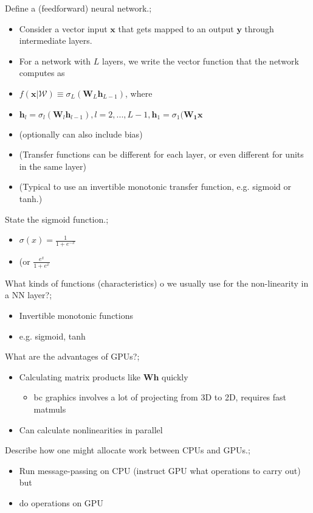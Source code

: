 \documentclass{article}
\begin{document}
Define a (feedforward) neural network.; \begin{itemize} \item Consider a vector input $\bm{x}$ that gets mapped to an output $\bm{y}$ through intermediate layers. \item For a network with $L$ layers, we write the vector function that the network computes as  \item $f(\bm{x}|\mathcal{W})\equiv \sigma_L(\bm{W}_L\bm{h}_{L-1})$, where \item $\bm{h}_l = \sigma_l(\bm{W}_l\bm{h}_{l-1}), l=2,...,L-1, \bm{h}_1 = \sigma_1(\bm{W_1x}$ \item (optionally can also include bias) \item (Transfer functions can be different for each layer, or even different for units in the same layer) \item (Typical to use an invertible monotonic transfer function, e.g. sigmoid or tanh.) \end{itemize}

State the sigmoid function.; \begin{itemize} \item $\sigma(x) = \frac{1}{1 + e^{-x}}$ \item (or $\frac{e^x}{1+e^x}$ \end{itemize}

What kinds of functions (characteristics) o we usually use for the non-linearity in a NN layer?; \begin{itemize} \item Invertible monotonic functions \item e.g. sigmoid, tanh \end{itemize}

What are the advantages of GPUs?; \begin{itemize} \item Calculating matrix products like $\mathbf{Wh}$ quickly \begin{itemize} \item bc graphics involves a lot of projecting from 3D to 2D, requires fast matmuls \end{itemize} \item Can calculate nonlinearities in parallel \end{itemize}

Describe how one might allocate work between CPUs and GPUs.; \begin{itemize} \item Run message-passing on CPU (instruct GPU what operations to carry out) but \item do operations on GPU \end{itemize}
\end{document}
